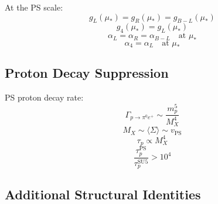 \documentclass[11pt,a4paper]{article}
\begin{document}
At the PS scale:
\begin{equation}
\label{eq:ext-unif-1}
g_L(\mu_*) = g_R(\mu_*) = g_{B-L}(\mu_*)
\end{equation}
\begin{equation}
\label{eq:ext-unif-2}
g_4(\mu_*) = g_L(\mu_*)
\end{equation}
\begin{equation}
\label{eq:ext-unif-3}
\alpha_L = \alpha_R = \alpha_{B-L} \quad \text{at } \mu_*
\end{equation}
\begin{equation}
\label{eq:ext-unif-4}
\alpha_4 = \alpha_L \quad \text{at } \mu_*
\end{equation}

\subsection*{Proton Decay Suppression}
\label{subsec:proton-decay}

PS proton decay rate:
\begin{equation}
\label{eq:ext-pd-1}
\Gamma_{p \to \pi^0 e^+} \sim \frac{m_p^5}{M_X^4}
\end{equation}
\begin{equation}
\label{eq:ext-pd-2}
M_X \sim \langle\Sigma\rangle \sim v_{\text{PS}}
\end{equation}
\begin{equation}
\label{eq:ext-pd-3}
\tau_p \propto M_X^4
\end{equation}
\begin{equation}
\label{eq:ext-pd-4}
\frac{\tau_p^{\text{PS}}}{\tau_p^{\text{SU5}}} > 10^{4}
\end{equation}

\subsection*{Additional Structural Identities}
\label{subsec:identities}
\end{document}
